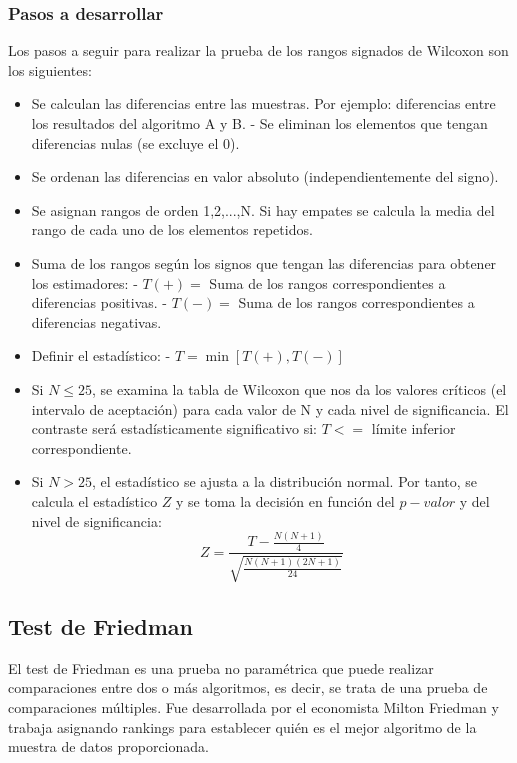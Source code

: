 \subsubsection{Pasos a desarrollar}
Los pasos a seguir para realizar la prueba de los rangos signados de Wilcoxon son los siguientes:
\begin{itemize}
\item Se calculan las diferencias entre las muestras. Por ejemplo: diferencias entre los resultados del algoritmo
A y B.
\subitem - Se eliminan los elementos que tengan diferencias nulas (se excluye el 0).
\item Se ordenan las diferencias en valor absoluto (independientemente del signo).
\item Se asignan rangos de orden 1,2,...,N. Si hay empates se calcula la media del rango de cada uno de los elementos
repetidos.
\item Suma de los rangos según los signos que tengan las diferencias para obtener los estimadores:
\subitem - $T(+) = $ Suma de los rangos correspondientes a diferencias positivas. 
\subitem - $T(-) = $ Suma de los rangos correspondientes a diferencias negativas.
\item Definir el estadístico:
\subitem - $T = \min [T(+), T(-)]$
\item Si $N \leq 25$, se examina la tabla de Wilcoxon que nos da los valores críticos (el intervalo de aceptación)
para cada valor de N y cada nivel de significancia. El contraste será estadísticamente significativo si: 
$T <= $ límite inferior correspondiente.
\item Si $N > 25$, el estadístico se ajusta a la distribución normal. Por tanto, se calcula el estadístico $Z$ y
se toma la decisión en función del $p-valor$ y del nivel de significancia:
\[ Z = \frac{T-\frac{N(N+1)}{4}}{\sqrt{\frac{N(N+1)(2N+1)}{24}}} \]
\end{itemize}


\subsection{Test de Friedman}
El test de Friedman es una prueba no paramétrica que puede realizar comparaciones entre dos o más algoritmos, es
decir, se trata de una prueba de comparaciones múltiples. Fue desarrollada por el economista Milton Friedman y
trabaja asignando rankings para establecer quién es el mejor algoritmo de la muestra de datos proporcionada.

